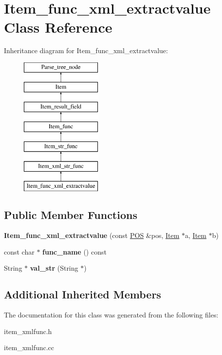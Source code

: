 \hypertarget{classItem__func__xml__extractvalue}{}\section{Item\+\_\+func\+\_\+xml\+\_\+extractvalue Class Reference}
\label{classItem__func__xml__extractvalue}
Inheritance diagram for Item\+\_\+func\+\_\+xml\+\_\+extractvalue\+:\begin{figure}[H]
\begin{center}
\leavevmode
\includegraphics[height=7.000000cm]{classItem__func__xml__extractvalue}
\end{center}
\end{figure}
\subsection*{Public Member Functions}
\begin{DoxyCompactItemize}
\item 
\mbox{\label{classItem__func__xml__extractvalue_afba8ea279a7b6fc52da238be4e866822}} 
{\bfseries Item\+\_\+func\+\_\+xml\+\_\+extractvalue} (const \mbox{\hyperlink{structYYLTYPE}{P\+OS}} \&pos, \mbox{\hyperlink{classItem}{Item}} $\ast$a, \mbox{\hyperlink{classItem}{Item}} $\ast$b)
\item 
\mbox{\label{classItem__func__xml__extractvalue_a33ab1ed2b4243a94667cf160ad10d4ec}} 
const char $\ast$ {\bfseries func\+\_\+name} () const
\item 
\mbox{\label{classItem__func__xml__extractvalue_a2de7c5dbde8d92b34a1535ba6245348e}} 
String $\ast$ {\bfseries val\+\_\+str} (String $\ast$)
\end{DoxyCompactItemize}
\subsection*{Additional Inherited Members}


The documentation for this class was generated from the following files\+:\begin{DoxyCompactItemize}
\item 
item\+\_\+xmlfunc.\+h\item 
item\+\_\+xmlfunc.\+cc\end{DoxyCompactItemize}
